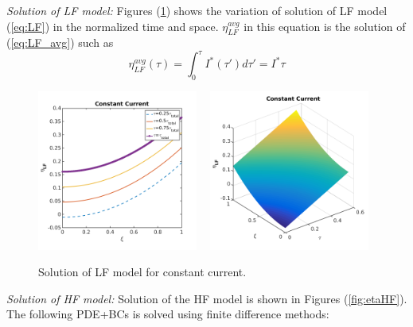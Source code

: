 \documentclass[]{article}
\begin{document}
\textit{Solution of LF model:}
Figures (\ref{fig:etaLF}) shows the variation of solution of LF model (\ref{eq:LF}) in the normalized time and space. $\eta_{LF}^{avg}$ in this equation is the solution of (\ref{eq:LF_avg}) such as
\begin{equation}\label{eq:Iprim}
{\eta_{LF}^{avg}}(\tau) = \int_0^{\tau} I^*(\tau') d\tau' 
 = I^* \tau
\end{equation}
\begin{figure}[h]
    \centering
    \includegraphics[trim = 0in 0in 0in 0in, clip, width=0.47\textwidth]{figures/etaLF2d.png}
    ~
    \includegraphics[trim = 0in 0in 0in 0in, clip, width=0.47\textwidth]{figures/etaLF3d.png}      
    \caption{Solution of LF model for constant current.}
    \label{fig:etaLF}
\end{figure}
\textit{Solution of HF model:}
Solution of the HF model is shown in Figures (\ref{fig:etaHF}). The following PDE+BCs is solved using finite difference methods:
\end{document}
